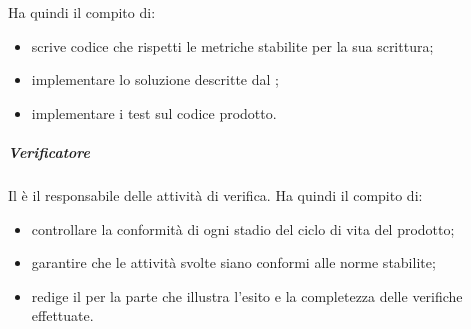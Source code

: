				Ha quindi il compito di:
					\begin{itemize}
						\item scrive codice che rispetti le metriche stabilite per la sua scrittura;
						\item implementare lo soluzione descritte dal \roleDesigner;
						\item implementare i test sul codice prodotto.
					\end{itemize}
				\subparagraph{Verificatore}
				Il \roleVerifier{} è il responsabile delle attività di verifica. \newline
				Ha quindi il compito di:
					\begin{itemize}
						\item controllare la conformità di ogni stadio del ciclo di vita del prodotto;
						\item garantire che le attività svolte siano conformi alle norme stabilite;
						\item redige il \docNameVersionPdQ{} per la parte che illustra l'esito e la completezza delle verifiche effettuate.
					\end{itemize}
		
